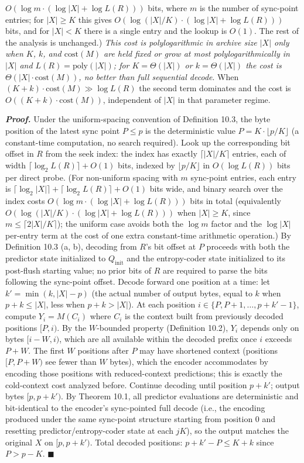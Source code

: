 \documentclass[
]{article}
\begin{document}
{$O(\log m \cdot (\log |X| + \log L(R)))$ bits, where $m$ is the
number of sync-point entries; for $|X| \geq K$ this gives
$O(\log(|X|/K) \cdot (\log |X| + \log L(R)))$ bits, and for
$|X| < K$ there is a single entry and the lookup is $O(1)$. The
rest of the analysis is unchanged.) \emph{This cost is polylogarithmic in archive size
$|X|$ only when $K$, $k$, and $\mathrm{cost}(M)$ are held fixed or
grow at most polylogarithmically in $|X|$ and
$L(R) = \mathrm{poly}(|X|)$; for
$K = \Theta(|X|)$ or $k = \Theta(|X|)$ the cost is
$\Theta(|X| \cdot \mathrm{cost}(M))$, no better than full sequential
decode}. When $(K+k) \cdot
\mathrm{cost}(M) \gg \log L(R)$ the second term dominates and the
cost is $O((K+k) \cdot \mathrm{cost}(M))$, independent of $|X|$ in
that parameter regime.}

\emph{\textbf{Proof.}} Under the uniform-spacing convention of
Definition 10.3, the byte position of the latest sync point
$P \leq p$ is the deterministic value $P = K \cdot \lfloor p/K \rfloor$
(a constant-time computation, no search required). Look up the
corresponding bit offset in $R$ from the seek index: the index has
exactly $\lceil |X|/K \rceil$ entries, each of width
$\lceil \log_2 L(R)\rceil + O(1)$ bits, indexed by $\lfloor p/K \rfloor$
in $O(\log L(R))$ bits per direct probe. (For non-uniform spacing
with $m$ sync-point entries, each entry is
$\lceil \log_2|X|\rceil + \lceil \log_2 L(R)\rceil + O(1)$
bits wide, and binary search over the index costs
$O(\log m \cdot (\log |X| + \log L(R)))$ bits in total
(equivalently $O(\log(|X|/K) \cdot (\log |X| + \log L(R)))$ when
$|X| \geq K$, since $m \leq \lceil 2|X|/K \rceil$); the
uniform case avoids both the $\log m$ factor and the
$\log |X|$ per-entry term at the cost of one extra constant-time
arithmetic operation.) By
Definition 10.3 (a, b), decoding from $R$'s bit offset at $P$
proceeds with both the predictor state initialized to
$Q_{\text{init}}$ and the entropy-coder state initialized to its
post-flush starting value; no prior bits of $R$ are required to
parse the bits following the sync-point offset. Decode forward one
position at a time: let $k' = \min(k, |X| - p)$ (the actual number
of output bytes, equal to $k$ when $p + k \leq |X|$, less when
$p + k > |X|$). At each position $i \in \{P, P+1, \ldots, p+k'-1\}$,
compute $Y_i = M(C_i)$ where $C_i$ is the context built from
previously decoded positions $[P, i)$. By the $W$-bounded property
(Definition 10.2), $Y_i$ depends only on bytes $[i-W, i)$, which are
all available within the decoded prefix once $i$ exceeds $P + W$. The
first $W$ positions after $P$ may have shortened context (positions
$[P, P+W)$ see fewer than $W$ bytes), which the encoder accommodates
by encoding those positions with reduced-context predictions; this is
exactly the cold-context cost analyzed before. Continue decoding
until position $p + k'$; output bytes $[p, p+k')$. By Theorem 10.1,
all predictor evaluations are deterministic and bit-identical to
the encoder's sync-pointed full decode (i.e., the encoding produced
under the same sync-point structure starting from position 0 and
resetting predictor/entropy-coder state at each $jK$), so the
output matches the original $X$ on $[p, p+k')$. Total decoded
positions: $p + k' - P \leq K + k$ since $P > p - K$.
\hfill$\blacksquare$
\end{document}

